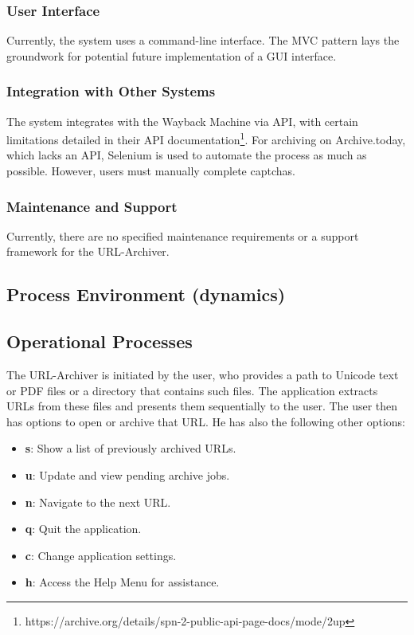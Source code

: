 \subsubsection{User Interface}
Currently, the system uses a command-line interface. The MVC pattern lays the groundwork for potential future implementation of a GUI interface.

\subsubsection{Integration with Other Systems}
The system integrates with the Wayback Machine via API, with certain limitations detailed in their API documentation\footnote{https://archive.org/details/spn-2-public-api-page-docs/mode/2up}. For archiving on Archive.today, which lacks an API, Selenium is used to automate the process as much as possible. However, users must manually complete captchas.

\subsubsection{Maintenance and Support}
Currently, there are no specified maintenance requirements or a support framework for the URL-Archiver.


\subsection{Process Environment (dynamics)}


\subsection{Operational Processes}
The URL-Archiver is initiated by the user, who provides a path to Unicode text or PDF files or a directory that contains such files. The application extracts URLs from these files and presents them sequentially to the user. The user then has options to open or archive that URL. He has also the following other options: 
\begin{itemize}
	\item \textbf{s}: Show a list of previously archived URLs.
	\item \textbf{u}: Update and view pending archive jobs.
	\item \textbf{n}: Navigate to the next URL.
	\item \textbf{q}: Quit the application.
	\item \textbf{c}: Change application settings.
	\item \textbf{h}: Access the Help Menu for assistance.
\end{itemize}

